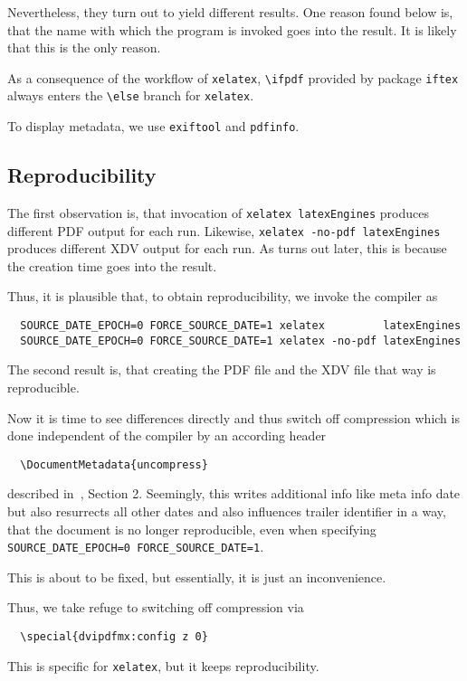 \documentclass[a4paper, english]{article}%
\newcommand{\xelatex}{\texttt{xelatex}}
\newcommand{\cmd}[1]{\texttt{\textbackslash#1}}
\begin{document}
Nevertheless, they turn out to yield different results. 
One reason found below is, 
that the name with which the program is invoked 
goes into the result. 
It is likely that this is the only reason. 

As a consequence of the workflow of \xelatex, 
\cmd{ifpdf} provided by package \texttt{iftex} 
always enters the \cmd{else} branch for \xelatex. 

To display metadata, we use \texttt{exiftool} and \texttt{pdfinfo}. 


\subsection{Reproducibility}\label{subsec:reprod}

The first observation is, that invocation of \texttt{xelatex latexEngines} 
produces different PDF output for each run. 
Likewise, \texttt{xelatex -no-pdf latexEngines} produces different XDV output for each run. 
As turns out later, this is because the creation time goes into the result. 

Thus, it is plausible that, to obtain reproducibility, we invoke the compiler as 
%
\begin{verbatim}
  SOURCE_DATE_EPOCH=0 FORCE_SOURCE_DATE=1 xelatex         latexEngines
  SOURCE_DATE_EPOCH=0 FORCE_SOURCE_DATE=1 xelatex -no-pdf latexEngines
\end{verbatim}

The second result is, that creating the PDF file and the XDV file that way is reproducible. 

Now it is time to see differences directly and thus switch off compression 
which is done independent of the compiler by an according header 
%
\begin{verbatim}
  \DocumentMetadata{uncompress}
\end{verbatim}
%
described in~\cite{DocMetaDataSuppCode}, Section 2. 
Seemingly, this writes additional info like meta info date 
but also resurrects all other dates and also influences trailer identifier in a way, 
that the document is no longer reproducible, 
even when specifying \texttt{SOURCE\_DATE\_EPOCH=0 FORCE\_SOURCE\_DATE=1}. 

This is about to be fixed, 
but essentially, it is just an inconvenience. 

Thus, we take refuge to switching off compression via 
%
\begin{verbatim}
  \special{dvipdfmx:config z 0}
\end{verbatim}
%
This is specific for \xelatex, but it keeps reproducibility. 
\end{document}
